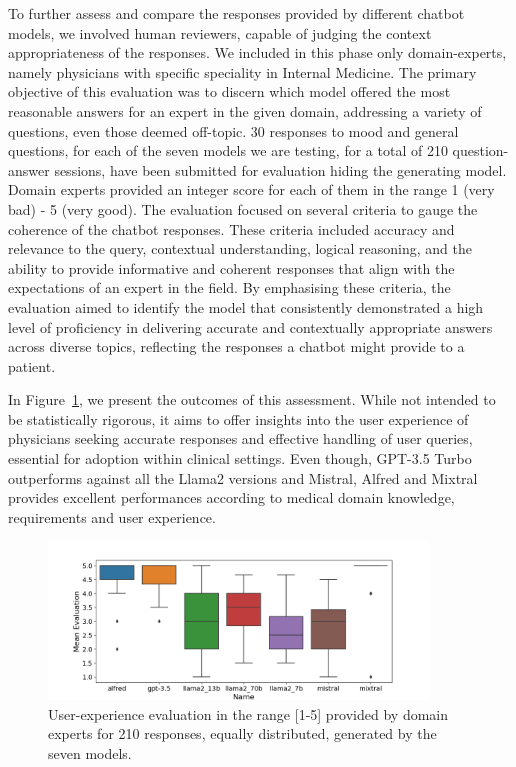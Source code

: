 \documentclass[preprint,12pt]{elsarticle}
\begin{document}
To further assess and compare the responses provided by different chatbot models, we involved human reviewers, capable of judging the context appropriateness of the responses.
%
We included in this phase only domain-experts, namely physicians with specific speciality in Internal Medicine.
%
The primary objective of this evaluation was to discern which model offered the most reasonable answers for an expert in the given domain, addressing a variety of questions, even those deemed off-topic. 
%
30 responses to mood and general questions, for each of the seven models we are testing, for a total of 210 question-answer sessions, have been submitted for evaluation hiding the generating model. Domain experts provided an integer score for each of them in the range 1 (very bad) - 5 (very good).
%
The evaluation focused on several criteria to gauge the coherence of the chatbot responses. These criteria included accuracy and relevance to the query, contextual understanding, logical reasoning, and the ability to provide informative and coherent responses that align with the expectations of an expert in the field. 
%
By emphasising these criteria, the evaluation aimed to identify the model that consistently demonstrated a high level of proficiency in delivering accurate and contextually appropriate answers across diverse topics, reflecting the responses a chatbot might provide to a patient.

%
In Figure~\ref{fig:eval-med}, we present the outcomes of this assessment. While not intended to be statistically rigorous, it aims to offer insights into the user experience of physicians seeking accurate responses and effective handling of user queries, essential for adoption within clinical settings.
%
Even though, GPT-3.5 Turbo outperforms against all the Llama2 versions and Mistral, Alfred and Mixtral provides excellent performances according to medical domain knowledge, requirements and user experience.
 
 



\begin{figure}[t]
	\centering
	\includegraphics[width=0.9\textwidth]{figures/Figure_all.png}
	\caption{User-experience evaluation in the range [1-5] provided by domain experts for 210 responses, equally distributed, generated by the seven models.}
	\label{fig:eval-med}
\end{figure}
\end{document}
